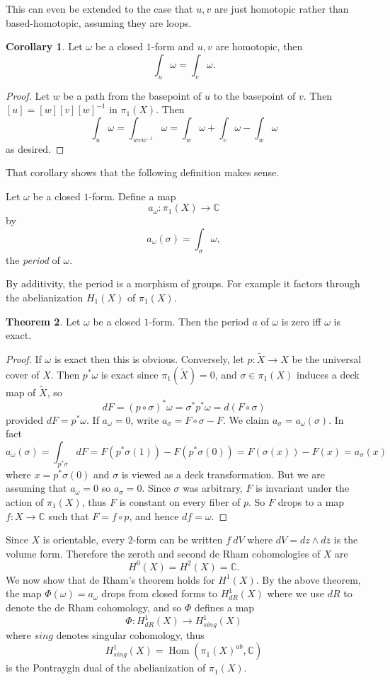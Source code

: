 \documentclass[12pt]{book}
\newcommand{\CC}{\mathbb{C}}
\DeclareMathOperator{\Hom}{Hom}
\newcommand{\dfn}[1]{\emph{#1}\index{#1}}
\theoremstyle{definition}
\newtheorem{theorem}{Theorem}[chapter]
\newtheorem{corollary}[theorem]{Corollary}
\newenvironment{definition}
  {\pushQED{\qed}\renewcommand{\qedsymbol}{$\diamondsuit$}\definitionx}
  {\popQED\endexamplex}
\begin{document}
This can even be extended to the case that $u,v$ are just homotopic rather than based-homotopic, assuming they are loops.

\begin{corollary}
Let $\omega$ be a closed $1$-form and $u,v$ are homotopic, then
$$\int_u \omega = \int_v \omega.$$
\end{corollary}
\begin{proof}
Let $w$ be a path from the basepoint of $u$ to the basepoint of $v$.
Then $[u] = [w][v][w]^{-1}$ in $\pi_1(X)$. Then
$$\int_u \omega = \int_{wvw^{-1}} \omega = \int_w \omega + \int_v \omega - \int_w \omega$$
as desired.
\end{proof}

That corollary shows that the following definition makes sense.

\begin{definition}
Let $\omega$ be a closed $1$-form. Define a map
$$a_\omega: \pi_1(X) \to \CC$$
by
$$a_\omega(\sigma) = \int_\sigma \omega,$$
the \dfn{period} of $\omega$.
\end{definition}

By additivity, the period is a morphism of groups.
For example it factors through the abelianization $H_1(X)$ of $\pi_1(X)$.

\begin{theorem}
Let $\omega$ be a closed $1$-form. Then the period $a$ of $\omega$ is zero iff $\omega$ is exact.
\end{theorem}
\begin{proof}
If $\omega$ is exact then this is obvious.
Conversely, let $p: \tilde X \to X$ be the universal cover of $X$.
Then $p^*\omega$ is exact since $\pi_1(\tilde X) = 0$, and $\sigma \in \pi_1(X)$ induces a deck map of $\tilde X$, so
$$dF = (p \circ \sigma)^* \omega = \sigma^* p^* \omega = d(F \circ \sigma)$$
provided $dF = p^*\omega$.
If $a_\omega = 0$, write $a_\sigma = F \circ \sigma - F$.
We claim $a_\sigma = a_\omega(\sigma)$. In fact
$$a_\omega(\sigma) = \int_{p^*\sigma} dF = F(p^*\sigma(1)) - F(p^*\sigma(0)) = F(\sigma(x)) - F(x) = a_\sigma(x)$$
where $x = p^*\sigma(0)$ and $\sigma$ is viewed as a deck transformation.
But we are assuming that $a_\omega = 0$ so $a_\sigma = 0$.
Since $\sigma$ was arbitrary, $F$ is invariant under the action of $\pi_1(X)$, thus $F$ is constant on every fiber of $p$.
So $F$ drops to a map $f: X \to \CC$ such that $F = f \circ p$, and hence $df = \omega$.
\end{proof}

Since $X$ is orientable, every $2$-form can be written $f~dV$ where $dV = dz \wedge d\overline z$ is the volume form.
Therefore the zeroth and second de Rham cohomologies of $X$ are
$$H^0(X) = H^2(X) = \CC.$$
We now show that de Rham's theorem holds for $H^1(X)$.
By the above theorem, the map $\Phi(\omega) = a_\omega$ drops from closed forms to $H^1_{dR}(X)$ where we use $dR$ to denote the de Rham cohomology, and so $\Phi$ defines a map
$$\Phi: H^1_{dR}(X) \to H^1_{sing}(X)$$
where $sing$ denotes singular cohomology, thus
$$H^1_{sing}(X) = \Hom(\pi_1(X)^{ab}, \CC)$$
is the Pontraygin dual of the abelianization of $\pi_1(X)$.
\end{document}
